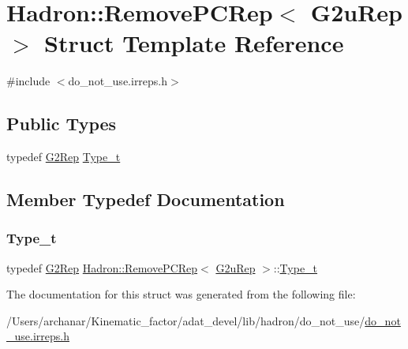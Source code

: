 \hypertarget{structHadron_1_1RemovePCRep_3_01G2uRep_01_4}{}\section{Hadron\+:\+:Remove\+P\+C\+Rep$<$ G2u\+Rep $>$ Struct Template Reference}
\label{structHadron_1_1RemovePCRep_3_01G2uRep_01_4}


{\ttfamily \#include $<$do\+\_\+not\+\_\+use.\+irreps.\+h$>$}

\subsection*{Public Types}
\begin{DoxyCompactItemize}
\item 
typedef \mbox{\hyperlink{structHadron_1_1G2Rep}{G2\+Rep}} \mbox{\hyperlink{structHadron_1_1RemovePCRep_3_01G2uRep_01_4_a3f2f1b8d829dddece230705318521005}{Type\+\_\+t}}
\end{DoxyCompactItemize}


\subsection{Member Typedef Documentation}
\mbox{\label{structHadron_1_1RemovePCRep_3_01G2uRep_01_4_a3f2f1b8d829dddece230705318521005}} 
\subsubsection{\texorpdfstring{Type\_t}{Type\_t}}
{\footnotesize\ttfamily typedef \mbox{\hyperlink{structHadron_1_1G2Rep}{G2\+Rep}} \mbox{\hyperlink{structHadron_1_1RemovePCRep}{Hadron\+::\+Remove\+P\+C\+Rep}}$<$ \mbox{\hyperlink{structHadron_1_1G2uRep}{G2u\+Rep}} $>$\+::\mbox{\hyperlink{structHadron_1_1RemovePCRep_3_01G2uRep_01_4_a3f2f1b8d829dddece230705318521005}{Type\+\_\+t}}}



The documentation for this struct was generated from the following file\+:\begin{DoxyCompactItemize}
\item 
/\+Users/archanar/\+Kinematic\+\_\+factor/adat\+\_\+devel/lib/hadron/do\+\_\+not\+\_\+use/\mbox{\hyperlink{do__not__use_8irreps_8h}{do\+\_\+not\+\_\+use.\+irreps.\+h}}\end{DoxyCompactItemize}
